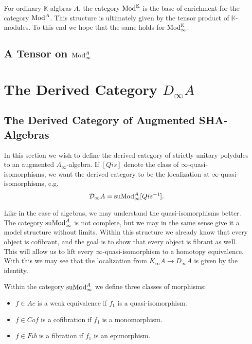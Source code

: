 \documentclass[../thesis.tex]{subfiles}
\begin{document}
            For ordinary $\mathbb{K}$-algbras $A$, the category $\tt{Mod}^\mathbb{K}$ is the base of enrichment for the category $\tt{Mod}^A$. This structure is ultimately given by the tensor product of $\mathbb{K}$-modules. To this end we hope that the same holds for $\tt{Mod}_\infty^\mathbb{K}$.
            
            

        \subsection{A Tensor on $\tt{Mod}_\infty^A$}

    \section{The Derived Category $D_\infty A$}

        \subsection{The Derived Category of Augmented SHA-Algebras} 

            In this section we wish to define the derived category of strictly unitary polydules to an augmented $A_\infty$-algebra. If $[Qis]$ denote the class of $\infty$-quasi-isomorphisms, we want the derived category to be the localization at $\infty$-quasi-isomorphisms, e.g.
            \begin{align*}
                \mathcal{D}_\infty A = \tt{suMod}_\infty^A[Qis^{-1}].
            \end{align*}

            Like in the case of algebras, we may understand the quasi-isomorphisms better. The category $\tt{suMod}_\infty^A$ is not complete, but we may in the same sense give it a model structure without limits. Within this structure we already know that every object is cofibrant, and the goal is to show that every object is fibrant as well. This will allow us to lift every $\infty$-quasi-isomorphism to a homotopy equivalence. With this we may see that the localization from $K_\infty A \to D_\infty A$ is given by the identity.

            Within the category $\tt{suMod}_\infty^A$ we define three classes of morphisms:
            \begin{itemize}
                \item $f\in Ac$ is a weak equivalence if $f_1$ is a quasi-isomorphism.
                \item $f\in Cof$ is a cofibration if $f_1$ is a monomorphism.
                \item $f\in Fib$ is a fibration if $f_1$ is an epimorphism.
            \end{itemize}
\end{document}
